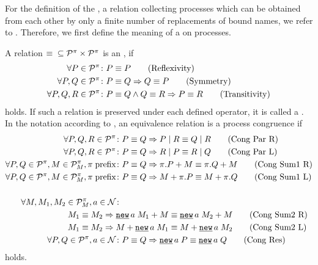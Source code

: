 For the definition of the , a relation collecting processes which can be obtained from each other by only a finite number of replacements of bound names, we refer to \cite{caires}. Therefore, we first define the meaning of a  on processes.

\begin{definition}[Congruence relation]%
\label{def_cong_rel}
A relation $\equiv{}\subseteq\mathcal P^{\pi}\times\mathcal P^{\pi}$ is an , if
\begin{align}
	\forall P\in\mathcal P^{\pi}&\colon P\equiv{}P \tag{Reflexivity} \\
	\forall P,Q\in\mathcal P^{\pi}&\colon P\equiv{}Q\Rightarrow Q\equiv{}P \tag{Symmetry}\\
	\forall P,Q,R\in\mathcal P^{\pi}&\colon P\equiv{}Q \wedge Q\equiv{}R \Rightarrow P\equiv{}R\tag{Transitivity}
\end{align}
holds. If such a relation is preserved under each defined operator, it is called a . In the notation according to \cite{meyer}, an equivalence relation is a process congruence if
\begin{align}
	\forall P,Q,R\in\procs&\colon P\equiv{}Q\Rightarrow \procpar{P}{R}\equiv{}\procpar{Q}{R} \tag{Cong Par R}\label{congparr}\\
	\forall P,Q,R\in\procs&\colon P\equiv{}Q\Rightarrow \procpar{R}{P}\equiv{}\procpar{R}{Q} \tag{Cong Par L}\label{congparl}\\
	\forall P,Q\in\procs,M\in\sums,\pi\;\text{prefix}&\colon P\equiv{}Q \Rightarrow \procchoice{\pi.P}{M}\equiv{}\procchoice{\pi.Q}{M}\tag{Cong Sum1 R}\label{congsum1r}\\
	\forall P,Q\in\procs,M\in\sums,\pi\;\text{prefix}&\colon P\equiv{}Q \Rightarrow \procchoice{M}{\pi.P}\equiv{}\procchoice{M}{\pi.Q}\tag{Cong Sum1 L}\label{congsum1l} \\\notag\\
	\forall M,M_1,M_2\in\sums,a\in\names&\colon \notag\\
				 M_1\equiv{}M_2 \Rightarrow\; & \procchoice{\procres{a}{M_1}}{M}\equiv{}\procchoice{\procres{a}{M_2}}{M}\tag{Cong Sum2 R}\label{congsum2r}\\
				 M_1\equiv{}M_2 \Rightarrow\; & \procchoice{M}{\procres{a}{M_1}}\equiv{}\procchoice{M}{\procres{a}{M_2}}\tag{Cong Sum2 L}\label{congsum2l}\\
	\forall P,Q\in\procs,a\in\names&\colon  P\equiv{}Q \Rightarrow \procres{a}{P}\equiv{}\procres{a}{Q}\tag{Cong Res}\label{congres}
\end{align}
holds.
\end{definition}

